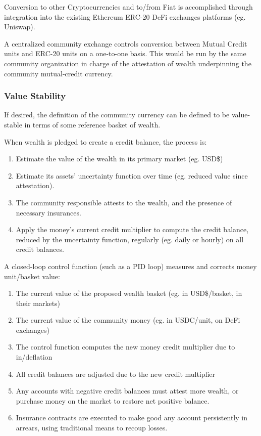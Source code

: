 \documentclass[11pt]{article}
\begin{document}
Conversion to other Cryptocurrencies and to/from Fiat is accomplished through integration into the
existing Ethereum ERC-20 DeFi exchanges platforms (eg. Uniswap).

A centralized community exchange controls conversion between Mutual Credit units and ERC-20 units
on a one-to-one basis.  This would be run by the same community organization in charge of the
attestation of wealth underpinning the community mutual-credit currency.

\subsubsection{Value Stability}
\label{sec:orga69a78b}

If desired, the definition of the community currency can be defined to be value-stable in terms
of some reference basket of wealth.

When wealth is pledged to create a credit balance, the process is:

\begin{enumerate}
\item Estimate the value of the wealth in its primary market (eg. USD\$)
\item Estimate its assets' uncertainty function over time (eg. reduced value since attestation).
\item The community responsible attests to the wealth, and the presence of necessary insurances.
\item Apply the money's current credit multiplier to compute the credit balance, reduced by the
uncertainty function, regularly (eg. daily or hourly) on all credit balances.
\end{enumerate}

A closed-loop control function (such as a PID loop) measures and corrects money unit/basket value:

\begin{enumerate}
\item The current value of the proposed wealth basket (eg. in USD\$/basket, in their markets)
\item The current value of the community money (eg. in USDC/unit, on DeFi exchanges)
\item The control function computes the new money credit multiplier due to in/deflation
\item All credit balances are adjusted due to the new credit multiplier
\item Any accounts with negative credit balances must attest more wealth, or purchase money on the market to restore net positive balance.
\item Insurance contracts are executed to make good any account persistently in arrears, using traditional means to recoup losses.
\end{enumerate}
\end{document}
